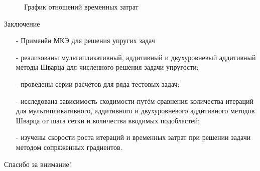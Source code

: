 \documentclass{beamer}
\begin{document}
\begin{frame}

\begin{figure}[h]
\caption{График отношений временных затрат}
\end{figure}

\end{frame}

\begin{frame}{Заключение}
\small
\begin{itemize}
\item[-]Применён МКЭ для решения упругих задач
\medskip
\item[-]реализованы мультипликативный, аддитивный и двухуровневый аддитивный методы Шварца для численного решения задачи упругости;
\medskip
\item[-]проведены серии расчётов для ряда тестовых задач;
\medskip
\item[-]исследована зависимость сходимости путём сравнения количества итераций для мультипликативного, аддитивного и двухуровневого аддитивного методов Шварца от шага сетки и количества вводимых подобластей;
\medskip
\item[-]изучены скорости роста итераций и временных затрат при решении задачи методом сопряженных градиентов.
\end{itemize}
\end{frame}

\begin{frame}{Спасибо за внимание!}

\end{frame}
\end{document}
